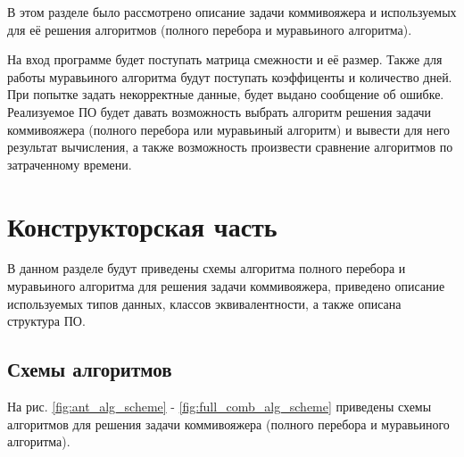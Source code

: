 \documentclass[a4paper,14pt, unknownkeysallowed]{extreport}
\begin{document}
В этом разделе было рассмотрено описание задачи коммивояжера и используемых для её решения алгоритмов (полного перебора и муравьиного алгоритма).

 На вход программе будет поступать матрица смежности и её размер. Также для работы муравьиного алгоритма будут поступать коэффиценты и количество дней. При попытке задать некорректные данные, будет выдано сообщение об ошибке. Реализуемое ПО будет давать возможность выбрать алгоритм решения задачи коммивояжера (полного перебора или муравьиный алгоритм) и вывести для него результат вычисления, а также возможность произвести сравнение алгоритмов по затраченному времени.



\chapter{Конструкторская часть}

В данном разделе будут приведены схемы алгоритма полного перебора и муравьиного алгоритма для решения задачи коммивояжера, приведено описание используемых типов данных, классов эквивалентности, а также описана структура ПО.

\section{Схемы алгоритмов}

На рис. \ref{fig:ant_alg_scheme} - \ref{fig:full_comb_alg_scheme} приведены схемы алгоритмов для решения задачи коммивояжера (полного перебора и муравьиного алгоритма).
\end{document}

